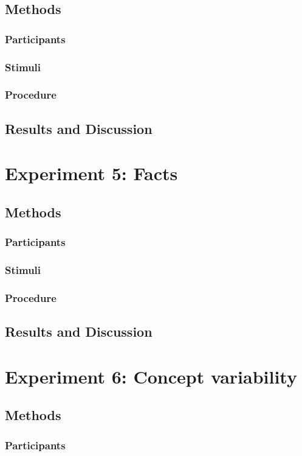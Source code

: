 \subsection{Methods}
\subsubsection{Participants} 
\subsubsection{Stimuli} 
\subsubsection{Procedure}
\subsection{Results and Discussion}

\section{Experiment 5: Facts}
\subsection{Methods}
\subsubsection{Participants} 
\subsubsection{Stimuli} 
\subsubsection{Procedure}
\subsection{Results and Discussion}

\section{Experiment 6: Concept variability}
\subsection{Methods}
\subsubsection{Participants} 

